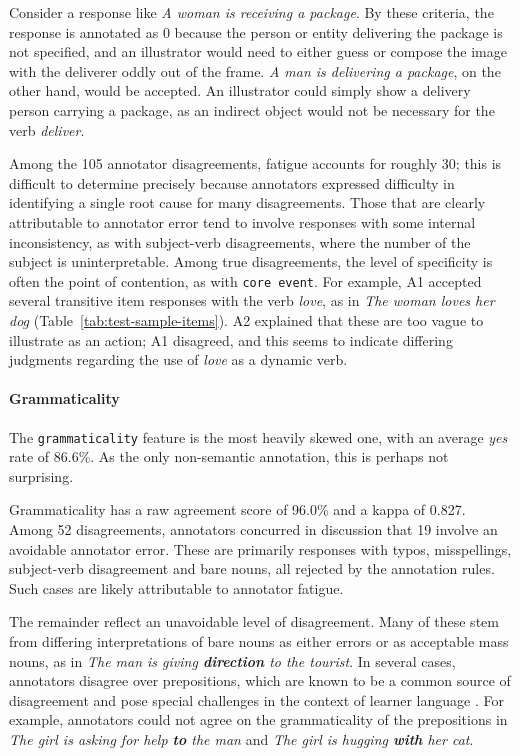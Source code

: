\documentclass[11pt,a4paper]{article}
\newcommand{\feat}[1]{\texttt{#1}}
\begin{document}
Consider a response like \textit{A woman is receiving a package}.  By these criteria, the response is annotated as 0 because the person or entity delivering the package is not specified, and an illustrator would need to either guess or compose the image with the deliverer oddly out of the frame. \textit{A man is delivering a package}, on the other hand, would be accepted. An illustrator could simply show a delivery person carrying a package, as an indirect object would not be necessary for the verb \textit{deliver}.

Among the 105 annotator disagreements, fatigue accounts for roughly 30; this is difficult to determine precisely because annotators expressed difficulty in identifying a single root cause for many disagreements. Those that are clearly attributable to annotator error tend to involve responses with some internal inconsistency, as with subject-verb disagreements, where the number of the subject is uninterpretable. Among true disagreements, the level of specificity is often the point of contention, as with \feat{core event}. For example, A1 accepted several transitive item responses with the verb \textit{love}, as in \textit{The woman loves her dog} (Table~\ref{tab:test-sample-items}). A2 explained that these are too vague to illustrate as an action; A1 disagreed, and this seems to indicate differing judgments regarding the use of \textit{love} as a dynamic verb.

\paragraph{Grammaticality} The \feat{grammaticality} feature is the most heavily skewed one, with an average \textit{yes} rate of 86.6\%.  As the only non-semantic annotation, this is perhaps not surprising.

Grammaticality has a raw agreement score of 96.0\% and a kappa of 0.827. Among 52 disagreements, annotators concurred in discussion that 19 involve an avoidable annotator error. These are primarily responses with typos, misspellings, subject-verb disagreement and bare nouns, all rejected by the annotation rules. Such cases are likely attributable to annotator fatigue.

The remainder reflect an unavoidable level of disagreement. Many of these stem from differing interpretations of bare nouns as either errors or as acceptable mass nouns, as in \textit{The man is giving \textbf{direction} to the tourist}. In several cases, annotators disagree over prepositions, which are known to be a common source of disagreement and pose special challenges in the context of learner language \citep{tetreault-chodorow:2008:HJCL,tetreault:chodorow:08}. For example, annotators could not agree on the grammaticality of the prepositions in \textit{The girl is asking for help \textbf{to} the man} and \textit{The girl is hugging \textbf{with} her cat}. 
\end{document}
